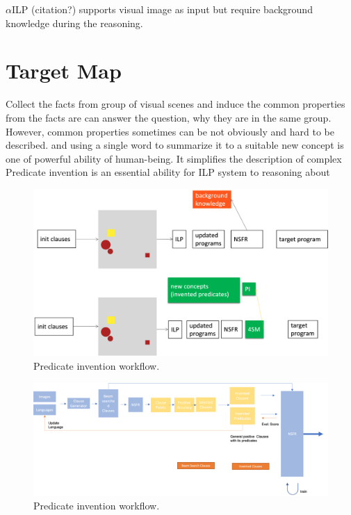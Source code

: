 \documentclass[
]{ceurart}
\begin{document}
$ \alpha $ILP (citation?) supports visual image as input but require background knowledge during the reasoning.


 
 

\section{Target Map}

Collect the facts from group of visual scenes and induce the common properties from the facts are 
can answer the question, why they are in the same group. However, common properties sometimes can be not obviously and hard to be described.
and using a single word  to summarize it to a suitable new concept is one of powerful ability of human-being. It simplifies the description of complex 
Predicate invention is an essential ability for ILP system to reasoning about 



\begin{figure}[h]
	\centering
	\begin{minipage}{\textwidth}
		\includegraphics[width=\linewidth]{img/intro_compare.png} 
		\caption{Predicate invention workflow.}
		\label{fig:Pipeline comparison between neural symbolic-ILP system without PI module and with PI module.}
	\end{minipage}
\end{figure}


\begin{figure}[h]
	\centering
	\begin{minipage}{\textwidth}
		\includegraphics[width=\linewidth]{img/pi_structure.png} 
		\caption{Predicate invention workflow.}
		\label{fig:pi-structure}
	\end{minipage}
\end{figure}
\end{document}
